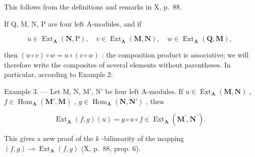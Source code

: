 This follows from the definitions and remarks in X, p.~88.

If Q, M, N, P are four left A-modules, and if

\[
u \in \operatorname{Ext} _ {\mathbf {A}} (\mathbf {N}, \mathrm{P}), \quad v \in \operatorname{Ext} _ {\mathbf {A}} (\mathbf {M}, \mathbf {N}), \quad w \in \operatorname{Ext} _ {\mathbf {A}} (\mathbf {Q}, \mathbf {M}),
\]

then \((u \circ v) \circ w = u \circ (v \circ w)\) : the composition product is associative; we will therefore write the composites of several elements without parentheses. In particular, according to Example 2:

Example 3. — Let M, N, M', N' be four left A-modules. If \(u \in \operatorname{Ext}_{\mathbf{A}}(\mathbf{M}, \mathbf{N})\) , \(f \in \operatorname{Hom}_{\mathbf{A}}(\mathbf{M}', \mathbf{M})\) , \(g \in \operatorname{Hom}_{\mathbf{A}}(\mathbf{N}, \mathbf{N}')\) , then

\[
\operatorname{Ext} _ {\mathbf {A}} (f, g) (u) = g \circ u \circ f \in \operatorname{Ext} _ {\mathbf {A}} (\mathbf {M} ^ {\prime}, \mathbf {N} ^ {\prime}).\tag{3}
\]

This gives a new proof of the \(k\) -bilinearity of the mapping \((f, g) \to \operatorname{Ext}_{\mathbf{A}}(f, g)\) (X, p.~88, prop. 6).


